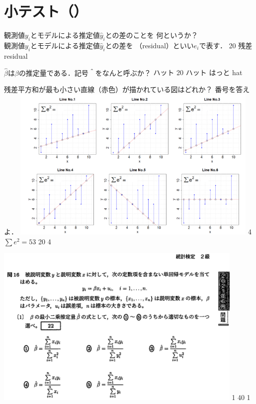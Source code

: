 \newcommand{\Release}{}
\newcommand{\Slide}{}
\newcommand{\PrintLecture}{1}
\newcommand{\PrintSolution}{1}







\maketitle

\section{小テスト（\MyClass）}

\begin{quiz}{\MyClass}

\QuizShortAnswer
{
  観測値$y_i$とモデルによる推定値$\hat{y}_i$との差のことを
  何というか？\\
}
{
  観測値$y_i$とモデルによる推定値$\hat{y}_i$との差を
  （residual）といい$e_i$で表す．
}
{20}
{残差}
{residual}
{}
{}

\QuizShortAnswer
{
  $\hat{\beta}$は$\beta$の推定量である．記号＾をなんと呼ぶか？
}
{
  ハット
}
{20}
{ハット}
{はっと}
{hat}
{}

\QuizShortAnswer
{
  残差平方和が最も小さい直線（赤色）が描かれている図はどれか？
  番号を答えよ．
  \includegraphics[width=0.9\textwidth]{quiz/residual.png}
}
{
  4\\
  $\sum e^2 = 53$
}
{20}
{4}
{}
{}
{}

\QuizShortAnswer
{
  \includegraphics[width=0.9\textwidth]{quiz/toukei_kentei.png}
}
{
  1
}
{40}
{1}
{}
{}
{}

\end{quiz}


